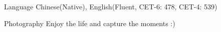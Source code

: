 

\begin{cvskills}
	
\cvskill
{Language} %
{Chinese(Native), English(Fluent, CET-6: 478, CET-4: 539)} %

\cvskill
{Photography} %
{Enjoy the life and capture the moments :)} %


\end{cvskills}
